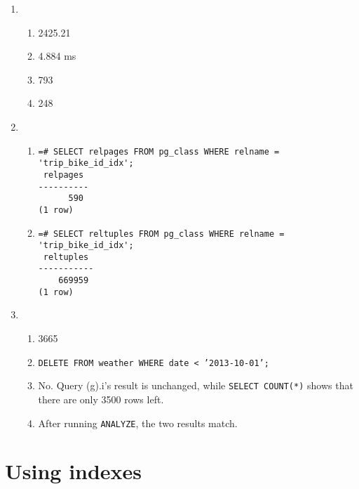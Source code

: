 \documentclass{homework}
\begin{document}
\begin{enumerate}
    \item \begin{enumerate}
        \item 2425.21
        \item 4.884 ms
        \item 793
        \item 248
    \end{enumerate}

    \item \begin{enumerate}
        \item \begin{verbatim}
=# SELECT relpages FROM pg_class WHERE relname = 'trip_bike_id_idx';
 relpages
----------
      590
(1 row)
\end{verbatim}
        \item \begin{verbatim}
=# SELECT reltuples FROM pg_class WHERE relname = 'trip_bike_id_idx';
 reltuples
-----------
    669959
(1 row)
\end{verbatim}
    \end{enumerate}

    \item \begin{enumerate}
        \item 3665
        \item \texttt{DELETE FROM weather WHERE date < '2013-10-01';}
        \item No. Query (g).i's result is unchanged, while \texttt{SELECT COUNT(*)} shows that there are only 3500 rows left.
        \item After running \texttt{ANALYZE}, the two results match.
    \end{enumerate}
\end{enumerate}

\section{Using indexes}
\end{document}
